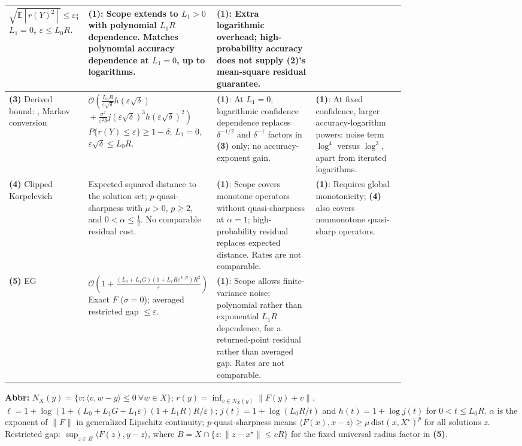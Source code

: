 \begin{table}[tp]
\begin{threeparttable}
\begin{tabularx}{\linewidth}{@{}>{\raggedright\arraybackslash}p{0.20\linewidth}>{\raggedright\arraybackslash}p{0.32\linewidth}>{\raggedright\arraybackslash}p{0.25\linewidth}>{\raggedright\arraybackslash}X@{}}
$\sqrt{\mathbb{E}[r(Y)^2]}\le\varepsilon$; $L_1=0$, $\varepsilon\le L_0R$.
& \textbf{(1)}: Scope extends to $L_1>0$ with polynomial $L_1R$ dependence. Matches polynomial accuracy dependence at $L_1=0$, up to logarithms.
& \textbf{(1)}: Extra logarithmic overhead; high-probability accuracy does not supply \textbf{(2)}'s mean-square residual guarantee. \\
\midrule
\textbf{(3)} Derived bound: \citep[Thm.~2.2]{sciJiLanZhu2026v2}, Markov conversion
& $\mathcal{O}\!\left(\frac{L_0R}{\varepsilon\sqrt\delta}h(\varepsilon\sqrt\delta)\right.$\newline
$\left.{}+\frac{\sigma^2}{\varepsilon^2\delta}j(\varepsilon\sqrt\delta)^3h(\varepsilon\sqrt\delta)^2\right)$\newline
$P\{r(Y)\le\varepsilon\}\ge1-\delta$; $L_1=0$, $\varepsilon\sqrt\delta\le L_0R$.
& \textbf{(1)}: At $L_1=0$, logarithmic confidence dependence replaces $\delta^{-1/2}$ and $\delta^{-1}$ factors in \textbf{(3)} only; no accuracy-exponent gain.
& \textbf{(1)}: At fixed confidence, larger accuracy-logarithm powers: noise term $\log^4$ versus $\log^3$, apart from iterated logarithms. \\
\midrule
\textbf{(4)} Clipped Korpelevich \citep[Thm.~4.4]{sgmVankov2025v2}
& Expected squared distance to the solution set; $p$-quasi-sharpness with $\mu>0$, $p\ge2$, and $0<\alpha\le\tfrac12$. No comparable residual cost.
& \textbf{(1)}: Scope covers monotone operators without quasi-sharpness at $\alpha=1$; high-probability residual replaces expected distance. Rates are not comparable.
& \textbf{(1)}: Requires global monotonicity; \textbf{(4)} also covers nonmonotone quasi-sharp operators. \\
\midrule
\textbf{(5)} EG \citep[Thm.~3.1]{scgmGreenbergLoizou2026v1}
& $\mathcal{O}\!\left(1+\frac{(L_0+L_1G)(1+L_1R e^{L_1R})R^2}{\varepsilon}\right)$\newline
Exact $F$ ($\sigma=0$); averaged restricted gap $\le\varepsilon$.
& \textbf{(1)}: Scope allows finite-variance noise; polynomial rather than exponential $L_1R$ dependence, for a returned-point residual rather than averaged gap. Rates are not comparable.
& \\
\bottomrule
\end{tabularx}
\begin{tablenotes}[flushleft]\footnotesize
\item[] \textbf{Abbr:} $N_X(y)=\{v:\langle v,w-y\rangle\le0\ \forall w\in X\}$; $r(y)=\inf_{v\in N_X(y)}\|F(y)+v\|$. $\ell=1+\log(1+(L_0+L_1G+L_1\varepsilon)(1+L_1R)R/\varepsilon)$; $j(t)=1+\log(L_0R/t)$ and $h(t)=1+\log j(t)$ for $0<t\le L_0R$. $\alpha$ is the exponent of $\|F\|$ in generalized Lipschitz continuity; $p$-quasi-sharpness means $\langle F(x),x-z\rangle\ge\mu\,\mathrm{dist}(x,X^\star)^p$ for all solutions $z$. Restricted gap: $\sup_{z\in B}\langle F(z),y-z\rangle$, where $B=X\cap\{z:\|z-x^\star\|\le cR\}$ for the fixed universal radius factor in \textbf{(5)}.

\end{tablenotes}
\end{threeparttable}
\end{table}
